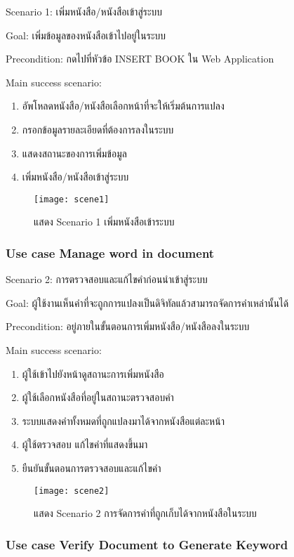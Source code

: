 Scenario 1: เพิ่มหนังสือ/หนังสือเข้าสู่ระบบ

Goal: เพิ่มข้อมูลของหนังสือเข้าไปอยู่ในระบบ

Precondition: กดไปที่หัวข้อ INSERT BOOK ใน Web Application 

Main success scenario:

\begin{enumerate}
    \item อัพโหลดหนังสือ/หนังสือเลือกหน้าที่จะให้เริ่มต้นการแปลง
    \item กรอกข้อมูลรายละเอียดที่ต้องการลงในระบบ
    \item แสดงสถานะของการเพิ่มข้อมูล
    \item เพิ่มหนังสือ/หนังสือเข้าสู่ระบบ
\end{enumerate}

\begin{figure}[H]
    \centering
    \texttt{[image: scene1]}
    \caption{แสดง Scenario 1 เพิ่มหนังสือเข้าระบบ}\label{fig:scene1}
\end{figure}

\subsubsection{Use case Manage word in document}

Scenario 2: การตรวจสอบและแก้ไขคำก่อนนำเข้าสู่ระบบ

Goal: ผู้ใช้งานเห็นคำที่จะถูกการแปลงเป็นดิจิทัลแล้วสามารถจัดการคำเหล่านั้นได้

Precondition: อยู่ภายในขั้นตอนการเพิ่มหนังสือ/หนังสือลงในระบบ

Main success scenario:

\begin{enumerate}
    \item ผู้ใช้เข้าไปยังหน้าดูสถานะการเพิ่มหนังสือ
    \item ผู้ใช้เลือกหนังสือที่อยู่ในสถานะตรวจสอบคำ
    \item ระบบแสดงคำทั้งหมดที่ถูกแปลงมาได้จากหนังสือแต่ละหน้า
    \item ผู้ใช้ตรวจสอบ แก้ไขคำที่แสดงขึ้นมา
    \item ยืนยันขั้นตอนการตรวจสอบและแก้ไขคำ
\end{enumerate}
\begin{figure}[H]
    \centering
    \texttt{[image: scene2]}
    \caption{แสดง Scenario 2 การจัดการคำที่ถูกเก็บได้จากหนังสือในระบบ}\label{fig:scene2}
\end{figure}

\subsubsection{Use case Verify Document to Generate Keyword}

